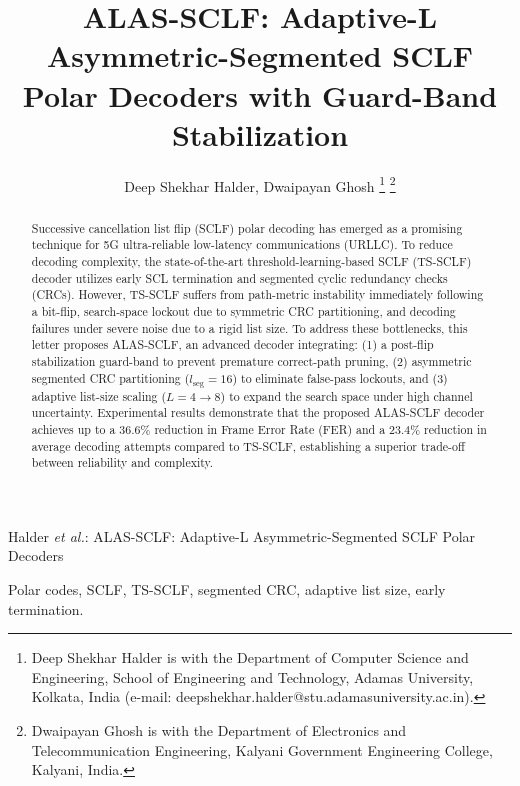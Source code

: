 \documentclass[journal,twocolumn]{IEEEtran}
\begin{document}
\title{ALAS-SCLF: Adaptive-L Asymmetric-Segmented SCLF Polar Decoders with Guard-Band Stabilization}

\author{Deep Shekhar Halder, Dwaipayan Ghosh
\thanks{Deep Shekhar Halder is with the Department of Computer Science and Engineering, School of Engineering and Technology, Adamas University, Kolkata, India (e-mail: deepshekhar.halder@stu.adamasuniversity.ac.in).}
\thanks{Dwaipayan Ghosh is with the Department of Electronics and Telecommunication Engineering, Kalyani Government Engineering College, Kalyani, India.}}

\maketitle

%
{Halder \MakeLowercase{\textit{et al.}}: ALAS-SCLF: Adaptive-L Asymmetric-Segmented SCLF Polar Decoders}

\begin{abstract}
Successive cancellation list flip (SCLF) polar decoding has emerged as a promising technique for 5G ultra-reliable low-latency communications (URLLC). To reduce decoding complexity, the state-of-the-art threshold-learning-based SCLF (TS-SCLF) decoder utilizes early SCL termination and segmented cyclic redundancy checks (CRCs). However, TS-SCLF suffers from path-metric instability immediately following a bit-flip, search-space lockout due to symmetric CRC partitioning, and decoding failures under severe noise due to a rigid list size. To address these bottlenecks, this letter proposes ALAS-SCLF, an advanced decoder integrating: (1) a post-flip stabilization guard-band to prevent premature correct-path pruning, (2) asymmetric segmented CRC partitioning ($l_{\text{seg}}=16$) to eliminate false-pass lockouts, and (3) adaptive list-size scaling ($L=4\rightarrow 8$) to expand the search space under high channel uncertainty. Experimental results demonstrate that the proposed ALAS-SCLF decoder achieves up to a 36.6\% reduction in Frame Error Rate (FER) and a 23.4\% reduction in average decoding attempts compared to TS-SCLF, establishing a superior trade-off between reliability and complexity.
\end{abstract}

\begin{IEEEkeywords}
Polar codes, SCLF, TS-SCLF, segmented CRC, adaptive list size, early termination.
\end{IEEEkeywords}
\end{document}
